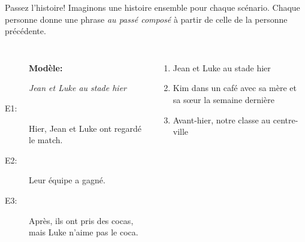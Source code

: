 \documentclass{beamer}
\begin{document}
  \begin{frame}{Passez l'histoire!}
    Imaginons une histoire ensemble pour chaque scénario.
    Chaque personne donne une phrase \emph{au passé composé} à partir de celle de la personne précédente. \\
    \begin{columns}
        \begin{description}
          \item[] \textbf{Modèle:}
          \item[] \emph{Jean et Luke au stade hier}
          \item[E1:] Hier, Jean et Luke ont regardé le match.
          \item[E2:] Leur équipe a gagné.
          \item[E3:] Après, ils ont pris des cocas, mais Luke n'aime pas le coca.
        \end{description}
        \begin{enumerate}
          \item Jean et Luke au stade hier
          \item Kim dans un café avec sa mère et sa sœur la semaine dernière
          \item Avant-hier, notre classe au centre-ville
        \end{enumerate}
    \end{columns}
  \end{frame}
\end{document}
